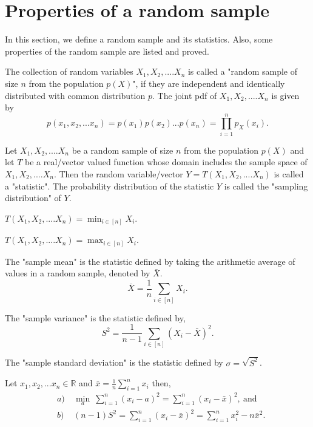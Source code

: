\documentclass[a4paper,english,12pt]{article}
\begin{document}
\section{Properties of a random sample}
In this section, we define a random sample and its statistics. Also, some properties of the random sample are listed and proved.
\begin{defn}
The collection of random variables $X_1, X_2, .... X_n$ is called a "random sample of size $n$ from the population $p(X)$", if they are independent and identically distributed with common distribution $p$.
The joint pdf of $X_1, X_2, .... X_n$ is given by 
\begin{equation}
p(x_1,x_2,...x_n) = p(x_1) p(x_2)...p(x_n) = \prod\limits_{i=1}^{n} p_X(x_i).
\end{equation} 
\end{defn}
\begin{defn}
Let $X_1, X_2, .... X_n$ be a random sample of size $n$ from the population $p(X)$ and let $T$ be a real/vector valued function whose domain includes the sample space of $X_1, X_2, .... X_n$. Then the random variable/vector $Y = T(X_1, X_2, .... X_n)$ is called a "statistic". The probability distribution of the statistic $Y$ is called the "sampling distribution" of $Y$.
\end{defn}
\begin{exmp}
$T(X_1, X_2, .... X_n) = \min_{i \in [n]} X_i$.
\end{exmp}
\begin{exmp}
$T(X_1, X_2, .... X_n) = \max_{i \in [n]} X_i$.
\end{exmp}
\begin{defn}
The "sample mean" is the statistic defined by taking the arithmetic average of values in a random sample, denoted by $\bar{X}$.
\begin{equation}
\bar{X} = \frac{1}{n} \sum_{i \in [n]} X_i.
\end{equation}
\end{defn}
\begin{defn}
The "sample variance" is the statistic defined by, 
\begin{equation}
S^2 = \frac{1}{n-1}  \sum_{i \in [n]} (X_i - \bar{X})^2.
\end{equation}
\end{defn}
\begin{defn}
The "sample standard deviation" is the statistic defined by $\sigma = \sqrt{S^2}$.
\end{defn}
\begin{thm}
Let $x_1, x_2,...x_n  \in \mathbb{R}$ and $\bar{x} = \frac{1}{n} \displaystyle \sum_{i=1}^{n} x_i$ then,
\begin{eqnarray}
&a)& ~ \min_{a} ~ \sum_{i=1}^{n} (x_i - a)^2 = \sum_{i=1}^{n} (x_i - \bar{x})^2,~\mbox{and} \\
&b)& ~ (n-1)S^2 = \sum_{i=1}^{n} (x_i - \bar{x})^2 = \sum_{i=1}^{n} x_i^2 - n\bar{x}^2.
\end{eqnarray}
\end{thm}
\end{document}
